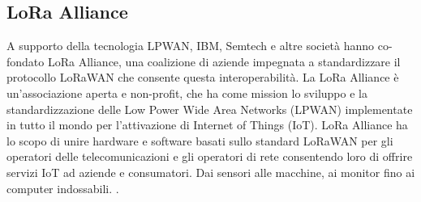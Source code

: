 \documentclass[a4paper]{report} %
\begin{document}
\subsection{LoRa Alliance}
A supporto della tecnologia LPWAN, IBM, Semtech e altre società hanno co-fondato LoRa Alliance, una coalizione di aziende impegnata a standardizzare il protocollo LoRaWAN che consente questa interoperabilità. La LoRa Alliance è un’associazione aperta e non-profit, che ha come mission lo sviluppo e la standardizzazione delle Low Power Wide Area Networks (LPWAN) implementate in tutto il mondo per l’attivazione di Internet of Things (IoT).  LoRa Alliance ha lo scopo di unire hardware e software basati sullo standard LoRaWAN per gli operatori delle telecomunicazioni e gli operatori di rete consentendo loro di offrire servizi IoT ad aziende e consumatori. Dai sensori alle macchine, ai monitor fino ai computer indossabili. \cite{art:rif.26}.
\end{document}
